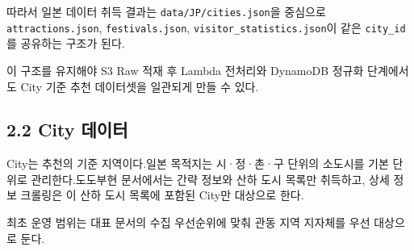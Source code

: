 \documentclass[12pt,a4paper]{article}
\newcommand{\DocNeedspace}[1]{\par\ifdim\dimexpr\pagegoal-\pagetotal\relax<#1\newpage\fi}
\begin{document}
\DocNeedspace{3\baselineskip}
따라서 일본 데이터 취득 결과는 \texttt{data/\allowbreak{}JP/\allowbreak{}cities.\allowbreak{}json}을 중심으로 \texttt{attractions.\allowbreak{}json}, \texttt{festivals.\allowbreak{}json}, \texttt{visitor\_\allowbreak{}statistics.\allowbreak{}json}이 같은 \texttt{city\_\allowbreak{}id}를 공유하는 구조가 된다.

\DocNeedspace{3\baselineskip}
이 구조를 유지해야 S3 Raw 적재 후 Lambda 전처리와 DynamoDB 정규화 단계에서도 City 기준 추천 데이터셋을 일관되게 만들 수 있다.


\DocNeedspace{24\baselineskip}
\subsection*{2.2 City 데이터}


\DocNeedspace{3\baselineskip}
City는 추천의 기준 지역이다.\newline 일본 목적지는 시·정·촌·구 단위의 소도시를 기본 단위로 관리한다.\newline 도도부현 문서에서는 간략 정보와 산하 도시 목록만 취득하고, 상세 정보 크롤링은 이 산하 도시 목록에 포함된 City만 대상으로 한다.


\DocNeedspace{3\baselineskip}
최초 운영 범위는 대표 문서의 수집 우선순위에 맞춰 관동 지역 지자체를 우선 대상으로 둔다.
\end{document}
